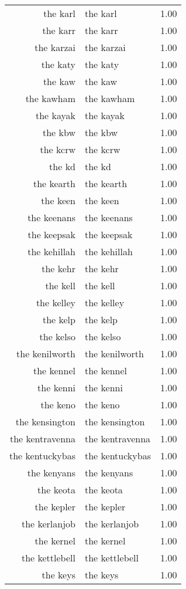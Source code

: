 \begin{table}[ht]
\begin{tabular}{rlr}
  the karl & the karl & 1.00 \\ 
  the karr & the karr & 1.00 \\ 
  the karzai & the karzai & 1.00 \\ 
  the katy & the katy & 1.00 \\ 
  the kaw & the kaw & 1.00 \\ 
  the kawham & the kawham & 1.00 \\ 
  the kayak & the kayak & 1.00 \\ 
  the kbw & the kbw & 1.00 \\ 
  the kcrw & the kcrw & 1.00 \\ 
  the kd & the kd & 1.00 \\ 
  the kearth & the kearth & 1.00 \\ 
  the keen & the keen & 1.00 \\ 
  the keenans & the keenans & 1.00 \\ 
  the keepsak & the keepsak & 1.00 \\ 
  the kehillah & the kehillah & 1.00 \\ 
  the kehr & the kehr & 1.00 \\ 
  the kell & the kell & 1.00 \\ 
  the kelley & the kelley & 1.00 \\ 
  the kelp & the kelp & 1.00 \\ 
  the kelso & the kelso & 1.00 \\ 
  the kenilworth & the kenilworth & 1.00 \\ 
  the kennel & the kennel & 1.00 \\ 
  the kenni & the kenni & 1.00 \\ 
  the keno & the keno & 1.00 \\ 
  the kensington & the kensington & 1.00 \\ 
  the kentravenna & the kentravenna & 1.00 \\ 
  the kentuckybas & the kentuckybas & 1.00 \\ 
  the kenyans & the kenyans & 1.00 \\ 
  the keota & the keota & 1.00 \\ 
  the kepler & the kepler & 1.00 \\ 
  the kerlanjob & the kerlanjob & 1.00 \\ 
  the kernel & the kernel & 1.00 \\ 
  the kettlebell & the kettlebell & 1.00 \\ 
  the keys & the keys & 1.00 \\ 

\end{tabular}
\end{table}
